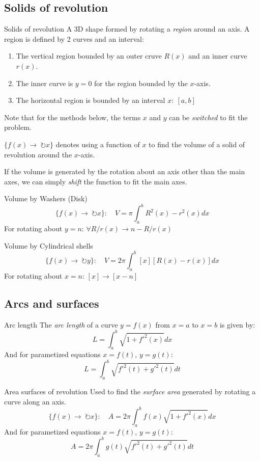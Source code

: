 \documentclass{article}
\begin{document}
\subsection{Solids of revolution}
\begin{definition}
    {Solids of revolution}
    A 3D shape formed by rotating a \emph{region} around an axis.
    \tcblower
    A region is defined by 2 curves and an interval:
    \begin{enumerate}
        \item The vertical region bounded by an outer cruve $R(x)$ and an inner curve $r(x)$.
        \item The inner curve is $y=0$ for the region bounded by the $x$-axis.
        \item The horizontal region is bounded by an interval $x:\ [a, b]$
    \end{enumerate}

    Note that for the methods below, the terms $x$ and $y$ can be \emph{switched} to fit the problem.

    $\{f(x)\to\ \circlearrowright x\}$ denotes using a function of $x$ to find the volume of a solid of revolution around the $x$-axis.

    If the volume is generated by the rotation about an axis other than the main axes, we can simply \emph{shift} the function to fit the main axes.
\end{definition}
\begin{theorem}
    {Volume by Washers (Disk)}
    \[\{f(x)\to\ \circlearrowright x\}:\quad V=\pi\int_{a}^{b}R^2(x)-r^2(x)dx\]
    For rotating about $y=n$: $\forall R/r(x)\to n-R/r(x)$
\end{theorem}
\begin{theorem}
    {Volume by Cylindrical shells}
    \[\{f(x)\to\ \circlearrowright y\}:\quad V=2\pi\int_{a}^{b}[x][R(x)-r(x)]dx\]
    For rotating about $x=n$: $[x]\to [x-n]$
\end{theorem}

\subsection{Arcs and surfaces}
\begin{theorem}
    {Arc length}
    The \emph{arc length} of a curve $y=f(x)$ from $x=a$ to $x=b$ is given by:
    \[L=\int_{a}^{b}\sqrt{1+f'^2(x)}dx\]
    And for parametized equations $x=f(t)$, $y=g(t)$:
    \[L=\int_{a}^{b}\sqrt{f'^2(t)+g'^2(t)}dt\]
\end{theorem}
\begin{theorem}
    {Area surfaces of revolution}
    Used to find the \emph{surface area} generated by rotating a curve along an axis.
    \[\{f(x)\to\ \circlearrowright x\}:\quad A=2\pi\int_{a}^{b}f(x)\sqrt{1+f'^2(x)}dx\]
    And for parametized equations $x=f(t)$, $y=g(t)$:
    \[A=2\pi\int_{a}^{b}g(t)\sqrt{f'^2(t)+g'^2(t)}dt\]
\end{theorem}
\end{document}
